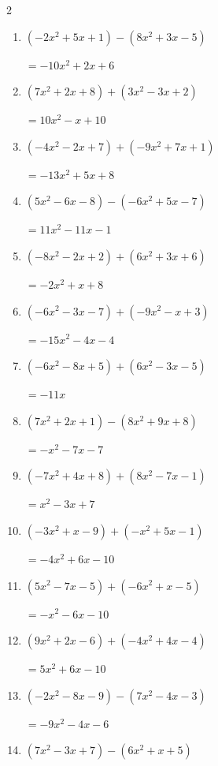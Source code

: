 \begin{multicols}{2}
\begin{enumerate}
  \item $(-2x^{2}+5x+1)-(8x^{2}+3x-5)$

        $=-10x^{2}+2x+6$

  \item $(7x^{2}+2x+8)+(3x^{2}-3x+2)$

        $=10x^{2}-x+10$

  \item $(-4x^{2}-2x+7)+(-9x^{2}+7x+1)$

        $=-13x^{2}+5x+8$

  \item $(5x^{2}-6x-8)-(-6x^{2}+5x-7)$

        $=11x^{2}-11x-1$

  \item $(-8x^{2}-2x+2)+(6x^{2}+3x+6)$

        $=-2x^{2}+x+8$

  \item $(-6x^{2}-3x-7)+(-9x^{2}-x+3)$

        $=-15x^{2}-4x-4$

  \item $(-6x^{2}-8x+5)+(6x^{2}-3x-5)$

        $=-11x$

  \item $(7x^{2}+2x+1)-(8x^{2}+9x+8)$

        $=-x^{2}-7x-7$

\columnbreak %

\resetques

  \item $(-7x^{2}+4x+8)+(8x^{2}-7x-1)$

        $=x^{2}-3x+7$

  \item $(-3x^{2}+x-9)+(-x^{2}+5x-1)$

        $=-4x^{2}+6x-10$

  \item $(5x^{2}-7x-5)+(-6x^{2}+x-5)$

        $=-x^{2}-6x-10$

  \item $(9x^{2}+2x-6)+(-4x^{2}+4x-4)$

        $=5x^{2}+6x-10$

  \item $(-2x^{2}-8x-9)-(7x^{2}-4x-3)$

        $=-9x^{2}-4x-6$

  \item $(7x^{2}-3x+7)-(6x^{2}+x+5)$


\end{enumerate}
\end{multicols}
